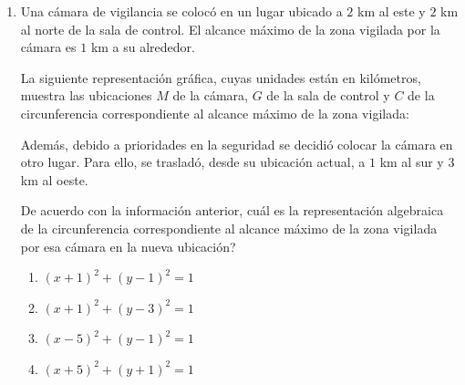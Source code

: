 \documentclass[12pt]{article}
\newcommand{\opcion}[2]{\item $#2$}
\newcommand{\puntodestacado}{0.16}
\newcommand{\rotuloxeste}{\mbox{x (este)}}
\newcommand{\rotuloynorte}{\mbox{y (norte)}}
\begin{document}
\begin{enumerate}[label=\textbf{\arabic*.}, itemsep=2.5cm]
De acuerdo con la informaci\'on anterior, \textquestiondown cu\'al de las siguientes representaciones algebraicas corresponde a la circunferencia que modela la zona de cobertura del lector?

\begin{enumerate}[label=\Alph*)]
  \opcion{A}{(x+4)^2+(y-6)^2=25}
  \opcion{B}{(x-4)^2+(y+6)^2=25}
  \opcion{C}{(x-4)^2+(y-6)^2=25}
  \opcion{D}{(x-1)^2+(y-6)^2=25}
\end{enumerate}

\Needspace{0.72\textheight}
\item
Una c\'amara de vigilancia se coloc\'o en un lugar ubicado a $2$ km al este y $2$ km al norte de la sala de control. El alcance m\'aximo de la zona vigilada por la c\'amara es $1$ km a su alrededor.

La siguiente representaci\'on gr\'afica, cuyas unidades est\'an en kil\'ometros, muestra las ubicaciones $M$ de la c\'amara, $G$ de la sala de control y $C$ de la circunferencia correspondiente al alcance m\'aximo de la zona vigilada:

\begin{center}
\end{center}

Adem\'as, debido a prioridades en la seguridad se decidi\'o colocar la c\'amara en otro lugar. Para ello, se traslad\'o, desde su ubicaci\'on actual, a $1$ km al sur y $3$ km al oeste.

De acuerdo con la informaci\'on anterior, \textquestiondown cu\'al es la representaci\'on algebraica de la circunferencia correspondiente al alcance m\'aximo de la zona vigilada por esa c\'amara en la nueva ubicaci\'on?

\begin{enumerate}[label=\Alph*)]
  \opcion{A}{(x+1)^2+(y-1)^2=1}
  \opcion{B}{(x+1)^2+(y-3)^2=1}
  \opcion{C}{(x-5)^2+(y-1)^2=1}
  \opcion{D}{(x+5)^2+(y+1)^2=1}
\end{enumerate}


\end{enumerate}
\end{document}
